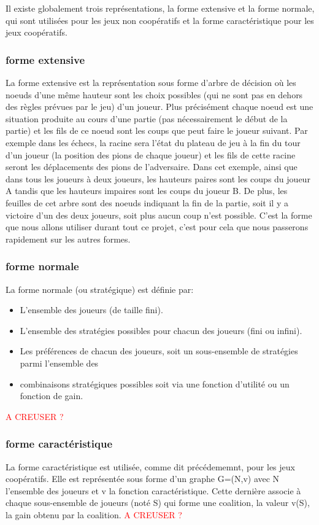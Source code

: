 \documentclass[a4paper, 12pt, french]{article}
\begin{document}
	Il existe globalement trois représentations\cite{wiki_theorie_jeux},
	la forme extensive et la forme normale, qui sont utilisées pour les jeux non coopératifs et
	la forme caractéristique pour les jeux coopératifs.

	\subsubsection{forme extensive}
	La forme extensive est la représentation sous forme d'arbre de décision où les noeuds d'une même hauteur sont les
	choix possibles (qui ne sont pas en dehors des règles prévues par le jeu) d'un joueur. Plus précisément chaque
	noeud est une situation produite au cours d'une partie (pas nécessairement le début de la partie) et les fils de
	ce noeud sont les coups que peut faire le joueur suivant. Par exemple dans les échecs, la racine sera l'état du
	plateau de jeu à la fin du tour d'un joueur (la position des pions de chaque joueur) et les fils de cette racine
	seront les déplacements des pions de l'adversaire. Dans cet exemple, ainsi que dans tous les joueurs à deux joueurs,
	les hauteurs paires sont les coups du joueur A tandis que les hauteurs impaires sont les coups du joueur B.
	De plus, les feuilles de cet arbre sont des noeuds indiquant la fin de la partie, soit il y a victoire d'un des
	deux joueurs, soit plus aucun coup n'est possible.
	C'est la forme que nous allons utiliser durant tout ce projet, c'est pour cela que nous passerons rapidement sur
	les autres formes.

	\subsubsection{forme normale}
	La forme normale (ou stratégique) est définie par:
	\begin{itemize}
		\item L'ensemble des joueurs (de taille fini).
		\item L'ensemble des stratégies possibles pour chacun des joueurs (fini ou infini).
		\item Les préférences de chacun des joueurs, soit un sous-ensemble de stratégies parmi l'ensemble des
		\item combinaisons stratégiques possibles soit via une fonction d'utilité ou un fonction de gain.
	\end{itemize}
	\textcolor{red}{A CREUSER ?}

	\subsubsection{forme caractéristique}
	La forme caractéristique est utilisée, comme dit précédememnt, pour les jeux coopératifs. Elle est représentée
	sous forme d'un graphe G=(N,v) avec N l'ensemble des joueurs et v la fonction caractéristique. Cette dernière
	associe à chaque sous-ensemble de joueurs (noté S) qui forme une coalition, la valeur v(S), la gain obtenu
	par la coalition. \textcolor{red}{A CREUSER ?}
\end{document}
